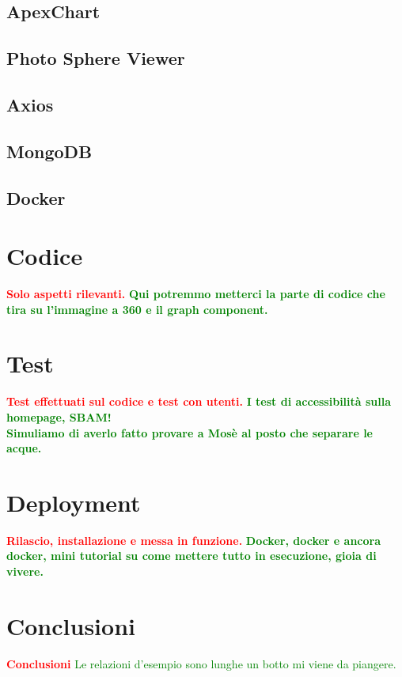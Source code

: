 \documentclass{article}
\begin{document}
\subsection{ApexChart}
\subsection{Photo Sphere Viewer}
\subsection{Axios}
\subsection{MongoDB}
\subsection{Docker}

\section{Codice}
\textcolor{red}{\textbf{Solo aspetti rilevanti.}}
\textcolor{green}{\textbf{Qui potremmo metterci la parte di codice che tira su l'immagine a 360 e il graph component.}}

\section{Test}
\textcolor{red}{\textbf{Test effettuati sul codice e test con utenti.}}
\textcolor{green}{\textbf{I test di accessibilità sulla homepage, SBAM!\\Simuliamo di averlo fatto provare a Mosè al posto che separare le acque.}}

\section{Deployment}
\textcolor{red}{\textbf{Rilascio, installazione e messa in funzione.}}
\textcolor{green}{\textbf{Docker, docker e ancora docker, mini tutorial su come mettere tutto in esecuzione, gioia di vivere.}}

\section{Conclusioni}
\textcolor{red}{\textbf{Conclusioni}}
\textcolor{green}{Le relazioni d'esempio sono lunghe un botto mi viene da piangere.}



\end{document}
